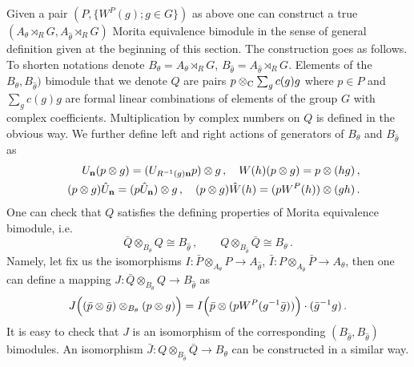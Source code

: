 \documentclass[a4paper,a4paper]{article}
\begin{document}
{Given a pair $(P, \{W^{P}(g) ; g\in G\})$ as above one can construct a true $(A_{\theta}\rtimes_{R}G , A_{\hat \theta}\rtimes_{R}G)$ 
Morita  equivalence bimodule  in the sense of general definition given at the beginning of this section. 
The construction goes as follows. To shorten notations denote $B_{\theta} = A_{\theta}\rtimes_{R}G$, 
$B_{\hat \theta} = A_{\hat \theta}\rtimes_{R}G$. 
Elements of the $B_{\theta}, B_{\hat \theta})$  bimodule 
that we denote $Q$ are  pairs $p\otimes_{\rm C} \sum_{g} c(g) g$ where $p\in P$ and $\sum_{g} c(g) g$ are formal linear 
combinations of elements of the group $G$ with complex coefficients. Multiplication by complex numbers on $Q$ is defined in 
the obvious way. 
We further define left and right actions of generators of $B_{\theta}$ and  $B_{\hat \theta}$ as 
\begin{eqnarray}
&& U_{\bf n}(p\otimes g) = (U_{R^{-1}(g){\bf n}}p)\otimes g \, , \quad W(h)(p\otimes g) = p\otimes (hg) \, , \nonumber \\
&& (p\otimes g)\hat U_{\bf n} = (p\hat U_{\bf n})\otimes g \, , \quad (p\otimes g)\hat W(h) = (pW^{P}(h))\otimes (gh) \, .
\end{eqnarray}    
One can check that $Q$ satisfies the defining properties of Morita equivalence bimodule, i.e. 
$$
\bar Q\otimes_{B_{\theta}} Q \cong B_{\hat \theta} \, , \qquad    Q\otimes_{B_{\hat \theta}} \bar Q \cong B_{ \theta} \, .
$$
Namely, let fix us the isomorphisms $I: \bar P\otimes_{A_{\theta}} P \to A_{\hat \theta}$, 
$\bar I:   P\otimes_{A_{\hat \theta}} \bar P \to A_{ \theta}$, then one can define 
a mapping   $J: \bar Q\otimes_{B_{\theta}} Q \to B_{\hat \theta}$   as  
$$
J \Bigl( (\bar p \otimes \bar g)\otimes_{B_{\theta}} (p\otimes g) \Bigr) = 
I\Bigl( \bar p \otimes (pW^{P}(g^{-1}\bar g)) \Bigr)\cdot (\bar g^{-1}g) \, .
$$ 
It is easy to check that $J$ is an isomorphism of the corresponding $ (B_{\hat \theta}, B_{\hat \theta})$ bimodules. 
An isomorphism $\bar J:  Q\otimes_{B_{\hat \theta}} \bar Q \to B_{ \theta}$ can be constructed in a similar way. 


}
\end{document}
